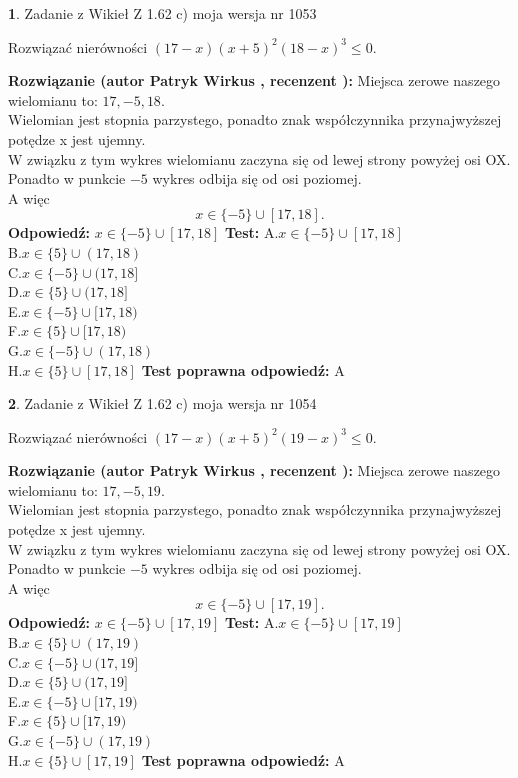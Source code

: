 \documentclass[12pt, a4paper]{article}
\theoremstyle{definition} %
\newtheorem{zad}{}
\newcommand{\zadStart}[1]{\begin{zad}#1\newline}
\newcommand{\zadStop}{\end{zad}}
\newcommand{\rozwStart}[2]{\noindent \textbf{Rozwiązanie (autor #1 , recenzent #2): }\newline}
\newcommand{\rozwStop}{\newline}
\newcommand{\odpStart}{\noindent \textbf{Odpowiedź:}\newline}
\newcommand{\odpStop}{\newline}
\newcommand{\testStart}{\noindent \textbf{Test:}\newline}
\newcommand{\testStop}{\newline}
\newcommand{\kluczStart}{\noindent \textbf{Test poprawna odpowiedź:}\newline}
\newcommand{\kluczStop}{\newline}
\begin{document}
\zadStart{Zadanie z Wikieł Z 1.62 c) moja wersja nr 1053}

Rozwiązać nierówności $(17-x)(x+5)^{2}(18-x)^{3}\le0$.
\zadStop
\rozwStart{Patryk Wirkus}{}
Miejsca zerowe naszego wielomianu to: $17, -5, 18$.\\
Wielomian jest stopnia parzystego, ponadto znak współczynnika przy\linebreak najwyższej potędze x jest ujemny.\\ W związku z tym wykres wielomianu zaczyna się od lewej strony powyżej osi OX.\\
Ponadto w punkcie $-5$ wykres odbija się od osi poziomej.\\
A więc $$x \in \{-5\} \cup [17,18].$$
\rozwStop
\odpStart
$x \in \{-5\} \cup [17,18]$
\odpStop
\testStart
A.$x \in \{-5\} \cup [17,18]$\\
B.$x \in \{5\} \cup (17,18)$\\
C.$x \in \{-5\} \cup (17,18]$\\
D.$x \in \{5\} \cup (17,18]$\\
E.$x \in \{-5\} \cup [17,18)$\\
F.$x \in \{5\} \cup [17,18)$\\
G.$x \in \{-5\} \cup (17,18)$\\
H.$x \in \{5\} \cup [17,18]$
\testStop
\kluczStart
A
\kluczStop



\zadStart{Zadanie z Wikieł Z 1.62 c) moja wersja nr 1054}

Rozwiązać nierówności $(17-x)(x+5)^{2}(19-x)^{3}\le0$.
\zadStop
\rozwStart{Patryk Wirkus}{}
Miejsca zerowe naszego wielomianu to: $17, -5, 19$.\\
Wielomian jest stopnia parzystego, ponadto znak współczynnika przy\linebreak najwyższej potędze x jest ujemny.\\ W związku z tym wykres wielomianu zaczyna się od lewej strony powyżej osi OX.\\
Ponadto w punkcie $-5$ wykres odbija się od osi poziomej.\\
A więc $$x \in \{-5\} \cup [17,19].$$
\rozwStop
\odpStart
$x \in \{-5\} \cup [17,19]$
\odpStop
\testStart
A.$x \in \{-5\} \cup [17,19]$\\
B.$x \in \{5\} \cup (17,19)$\\
C.$x \in \{-5\} \cup (17,19]$\\
D.$x \in \{5\} \cup (17,19]$\\
E.$x \in \{-5\} \cup [17,19)$\\
F.$x \in \{5\} \cup [17,19)$\\
G.$x \in \{-5\} \cup (17,19)$\\
H.$x \in \{5\} \cup [17,19]$
\testStop
\kluczStart
A
\kluczStop
\end{document}
